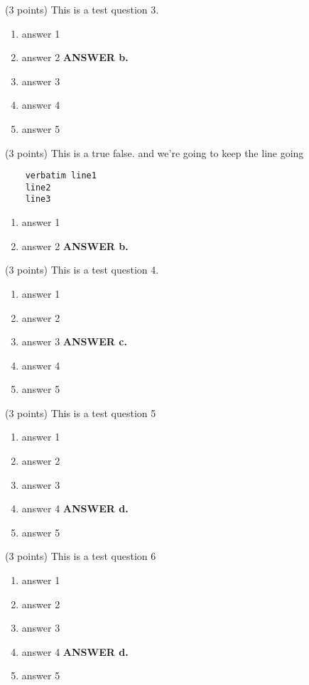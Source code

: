 \documentclass{article}
\newcommand{\ans}[1]{ \ifnum\showans=1 {\bf ANSWER #1.} \fi }
\begin{document}

\item (3 points) This is a test question 3.
  \begin{enumerate}
  \item answer 1
  \item answer 2  \ans{b}
  \item answer 3
  \item answer 4
  \item answer 5
  \end{enumerate}

\item (3 points) This is a true false.
and we're going to keep the line going
\begin{verbatim}
    verbatim line1
    line2
    line3
\end{verbatim}
  \begin{enumerate}
  \item answer 1
  \item answer 2  \ans{b}
  \end{enumerate}

\item (3 points) This is a test question 4. 
  \begin{enumerate}
  \item answer 1
  \item answer 2
  \item answer 3  \ans{c}
  \item answer 4
  \item answer 5
  \end{enumerate}

\item (3 points) This is a test question 5
  \begin{enumerate}
  \item answer 1
  \item answer 2
  \item answer 3
  \item answer 4  \ans{d}
  \item answer 5
  \end{enumerate}

\item (3 points) This is a test question 6
  \begin{enumerate}
  \item answer 1
  \item answer 2
  \item answer 3
  \item answer 4  \ans{d}
  \item answer 5
  \end{enumerate}
\end{document}
